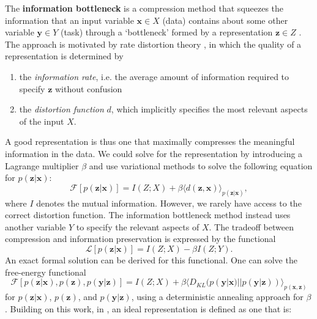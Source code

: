 The \textbf{information bottleneck} is a compression method that squeezes the information that an input variable $\mathbf{x} \in X$ (data) contains about some other variable $\mathbf{y} \in Y$ (task) through a `bottleneck' formed by a representation $\mathbf{z} \in Z$ \cite{tishby2000information}. The approach is motivated by rate distortion theory \cite{cover2012elements}, in which the quality of a representation is determined by
\begin{enumerate}
	\item the \textit{information rate}, i.e. the average amount of information required to specify $\mathbf{z}$ without confusion
	\item the \textit{distortion function} $d$, which implicitly specifies the most relevant aspects of the input $X$. 
\end{enumerate}
\noindent A good representation is thus one that maximally compresses the meaningful information in the data. We could solve for the representation by introducing a Lagrange multiplier $\beta$ and use variational methods to solve the following equation for $p(\mathbf{z}|\mathbf{x})$:
\begin{equation}
	\mathcal{F} [p(\mathbf{z}|\mathbf{x})] = I(Z; X) + \beta \langle d(\mathbf{z}, \mathbf{x}) \rangle_{p(\mathbf{z}|\mathbf{x})},
\end{equation}
\noindent where $I$ denotes the mutual information. However, we rarely have access to the correct distortion function. The information bottleneck method instead uses another variable $Y$ to specify the relevant aspects of $X$. The tradeoff between compression and information preservation is expressed by the functional
\begin{equation}
	\mathcal{L} [p(\mathbf{z}|\mathbf{x})] = I(Z; X) - \beta I(Z; Y).
\end{equation}
\noindent An exact formal solution can be derived for this functional. One can solve the free-energy functional
\begin{equation}
	\mathcal{F}[p(\mathbf{z} | \mathbf{x}), p(\mathbf{z}), p(\mathbf{y} | \mathbf{z})] = I(Z; X) + \beta \langle D_{KL} (p(\mathbf{y} | \mathbf{x}) || p(\mathbf{y} | \mathbf{z}) ) \rangle_{p(\mathbf{x}, \mathbf{z})}
\end{equation}
\noindent for $p(\mathbf{z} | \mathbf{x})$, $p(\mathbf{z})$, and $p(\mathbf{y} | \mathbf{z})$, using a deterministic annealing approach for $\beta$. Building on this work, in \cite{achille2017emergence}, an ideal representation is defined as one that is:
